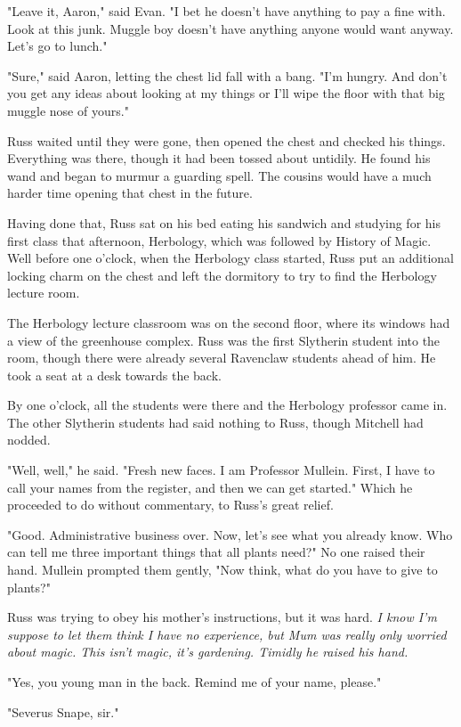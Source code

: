 \documentclass[a4paper,11pt]{article}
\begin{document}
"Leave it, Aaron," said Evan. "I bet he doesn't have anything to pay a fine with. Look at this junk. Muggle boy doesn't have anything anyone would want anyway. Let's go to lunch."

"Sure," said Aaron, letting the chest lid fall with a bang. "I'm hungry. And don't you get any ideas about looking at my things or I'll wipe the floor with that big muggle nose of yours."

Russ waited until they were gone, then opened the chest and checked his things. Everything was there, though it had been tossed about untidily. He found his wand and began to murmur a guarding spell. The cousins would have a much harder time opening that chest in the future.

Having done that, Russ sat on his bed eating his sandwich and studying for his first class that afternoon, Herbology, which was followed by History of Magic. Well before one o'clock, when the Herbology class started, Russ put an additional locking charm on the chest and left the dormitory to try to find the Herbology lecture room.

The Herbology lecture classroom was on the second floor, where its windows had a view of the greenhouse complex. Russ was the first Slytherin student into the room, though there were already several Ravenclaw students ahead of him. He took a seat at a desk towards the back.

By one o'clock, all the students were there and the Herbology professor came in. The other Slytherin students had said nothing to Russ, though Mitchell had nodded.

"Well, well," he said. "Fresh new faces. I am Professor Mullein. First, I have to call your names from the register, and then we can get started." Which he proceeded to do without commentary, to Russ's great relief.

"Good. Administrative business over. Now, let's see what you already know. Who can tell me three important things that all plants need?" No one raised their hand. Mullein prompted them gently, "Now think, what do you have to give to plants?"

Russ was trying to obey his mother's instructions, but it was hard. \emph{I know I'm suppose to let them think I have no experience, but Mum was really only worried about magic. This isn't magic, it's gardening. Timidly he raised his hand.}

"Yes, you young man in the back. Remind me of your name, please."

"Severus Snape, sir."
\end{document}

